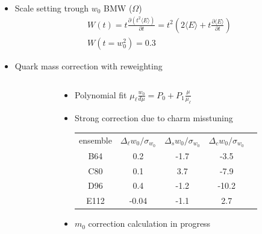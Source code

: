 \documentclass[xcolor={dvipsnames,table}]{beamer}
\begin{document}
\begin{frame}
  \begin{itemize}
    \item Scale setting trough $w_0$ BMW ($\Omega$)
          \begin{gather*}
            W(t)=t\frac{\partial (t^2\langle E\rangle)}{\partial t}=t^2\left( 2\langle E\rangle +t \frac{\partial\langle E\rangle}{\partial t}\right)\\
            W(t=w_0^2)=0.3
          \end{gather*}
    \item<2-> Quark mass correction with reweighting
  \end{itemize}
  \begin{columns}
    \begin{column}{0.5\textwidth}
    \end{column}
    \begin{column}{0.5\textwidth}
      \begin{itemize}
        \item<2-> Polynomial fit $\mu_\ell \frac{w_0}{d\mu}=P_0+P_1\frac{\mu}{\mu_\ell}$
        \item<3-> Strong correction due to charm misstuning
              \begin{tabular}{c|c|c|c|c}
                ensemble & $\Delta_\ell w_0 / \sigma_{w_0}$ & $\Delta_s w_0 / \sigma_{w_0}$ & $\Delta_c w_0 / \sigma_{w_0}$ \\
                B64      & 0.2                      & -1.7  &  -3.5                             \\
                C80      & 0.1                      & 3.7   & -7.9                              \\
                D96      & 0.4                      & -1.2  & -10.2                              \\
                E112     & -0.04                    & -1.1 & 2.7
              \end{tabular}
        \item<4-> $m_0$ correction calculation in progress
      \end{itemize}
    \end{column}
  \end{columns}
\end{frame}
\end{document}
